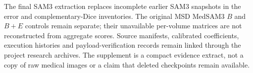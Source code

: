\documentclass[12pt,a4paper]{article}
\begin{document}
The final SAM3 extraction replaces incomplete earlier SAM3 snapshots in
the error and complementary-Dice inventories. The original MSD MedSAM3
$B$ and $B+E$ controls remain separate; their unavailable per-volume
matrices are not reconstructed from aggregate scores. Source manifests,
calibrated coefficients, execution histories and payload-verification
records remain linked through the project research archives. The
supplement is a compact evidence extract, not a copy of raw medical
images or a claim that deleted checkpoints remain available.
\end{document}

